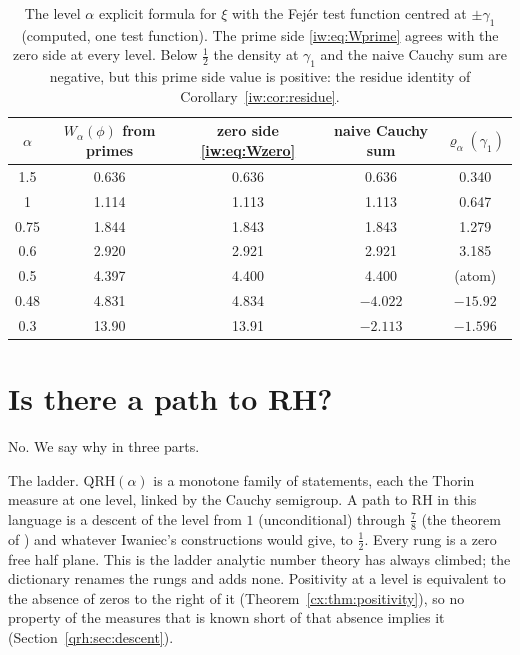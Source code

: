 \begin{table}[htbp]
\centering\small
\begin{tabular}{ccccc}
\toprule
$\alpha$ & $W_\alpha(\phi)$ from primes & zero side \eqref{iw:eq:Wzero} & naive Cauchy sum & $\varrho_\alpha(\gamma_1)$\\
\midrule
1.5 & 0.636 & 0.636 & 0.636 & 0.340\\
1 & 1.114 & 1.113 & 1.113 & 0.647\\
0.75 & 1.844 & 1.843 & 1.843 & 1.279\\
0.6 & 2.920 & 2.921 & 2.921 & 3.185\\
0.5 & 4.397 & 4.400 & 4.400 & (atom)\\
0.48 & 4.831 & 4.834 & $-4.022$ & $-15.92$\\
0.3 & 13.90 & 13.91 & $-2.113$ & $-1.596$\\
\bottomrule
\end{tabular}
\caption{The level $\alpha$ explicit formula for $\xi$ with the Fej\'er test function centred at $\pm\gamma_1$ (computed, one test function). The prime side \eqref{iw:eq:Wprime} agrees with the zero side at every level. Below $\frac12$ the density at $\gamma_1$ and the naive Cauchy sum are negative, but this prime side value is positive: the residue identity of Corollary~\ref{iw:cor:residue}.}
\label{iw:tab:weil}
\end{table}

\section{Is there a path to RH?}\label{iw:sec:path}

No. We say why in three parts.

The ladder. $\mathrm{QRH}(\alpha)$ is a monotone family of statements, each the Thorin measure at one level, linked by the Cauchy semigroup. A path to RH in this language is a descent of the level from $1$ (unconditional) through $\frac78$ (the theorem of \cite{OAI26a}) and whatever Iwaniec's constructions would give, to $\frac12$. Every rung is a zero free half plane. This is the ladder analytic number theory has always climbed; the dictionary renames the rungs and adds none. Positivity at a level is equivalent to the absence of zeros to the right of it (Theorem~\ref{cx:thm:positivity}), so no property of the measures that is known short of that absence implies it (Section~\ref{qrh:sec:descent}).

